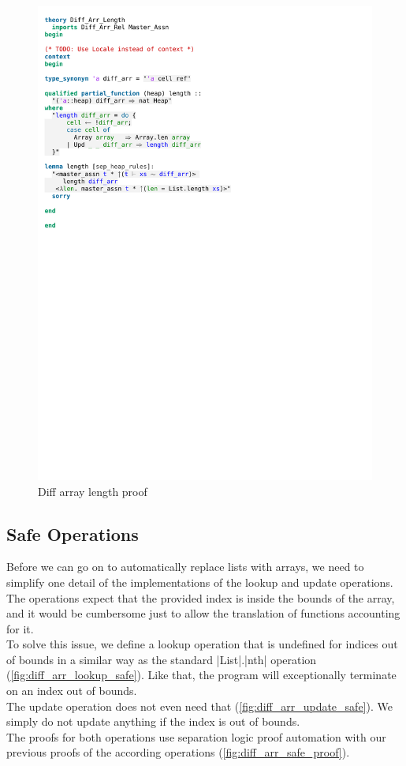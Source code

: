 \begin{figure}[htpb]
    \includegraphics[trim={0 18cm 0 9,8cm}, clip, width=1.00\textwidth]{figures/Theory_Diff_Arr_Length.pdf}
    \caption[Diff array length proof]{Diff array length proof}
    \label{fig:diff_arr_length_proof}
\end{figure}

\subsection{Safe Operations}\label{section:safe_diff_arr}

Before we can go on to automatically replace lists with arrays, we need to simplify one detail of the implementations of the lookup and update operations. The operations expect that the provided index is inside the bounds of the array, and it would be cumbersome just to allow the translation of functions accounting for it.\\
To solve this issue, we define a lookup operation that is undefined for indices out of bounds in a similar way as the standard |List|.|nth| operation (\autoref{fig:diff_arr_lookup_safe}). Like that, the program will exceptionally terminate on an index out of bounds.\\
The update operation does not even need that (\autoref{fig:diff_arr_update_safe}). We simply do not update anything if the index is out of bounds.\\
The proofs for both operations use separation logic proof automation with our previous proofs of the according operations (\autoref{fig:diff_arr_safe_proof}).


